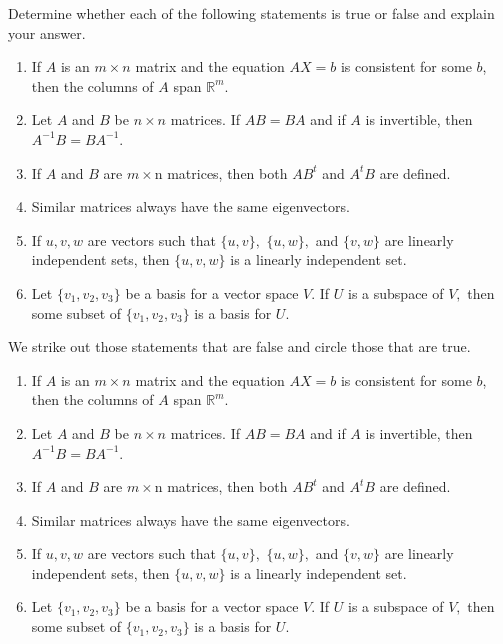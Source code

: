\documentclass{ximera}
\begin{document}


\problemlabel



\begin{exercise}\label{mc.exercise14}

Determine whether each of the following statements is true or false and explain your answer.  
\begin{enumerate}%
\item If $A$ is an $m\times n$ matrix and the equation $AX=b$ is consistent for some $b$, then the columns of $A$ span $\mathbb{R}^m$.
\item Let $A$ and $B$ be $n\times n$ matrices. If $AB = BA$ and if $A$ is invertible, then $A^{-1} B= B A^{-1}$. 
\item If $A$ and $B$ are $m\times$n matrices, then both $AB^t$ and $A^t B$ are defined.
\item Similar matrices always have the same eigenvectors.
\item If $u,v,w$ are vectors such that $\{u,v\},$ $\{u,w\},$ and $\{v,w\}$ are linearly independent sets, then $\{u,v,w\}$ is a linearly independent set.
\item Let $\{v_1,v_2,v_3\}$ be a basis for a vector space $V$. If $U$ is a subspace of $V,$ then some subset of $\{v_1,v_2,v_3\}$ is a basis for $U$.
\end{enumerate}
\begin{solution}

\ans 
We strike out those statements that are false and circle those that are true.
\begin{enumerate}%
\item {If $A$ is an $m\times n$ matrix and the equation $AX=b$ is consistent for some $b$, then the columns of $A$ span $\mathbb{R}^m$.}
\item {Let $A$ and $B$ be $n\times n$ matrices. If $AB = BA$ and if $A$ is invertible, then $A^{-1} B= B A^{-1}$.}
\item {If $A$ and $B$ are $m\times$n matrices, then both $AB^t$ and $A^t B$ are defined.}
\item {Similar matrices always have the same eigenvectors.}
\item {If $u,v,w$ are vectors such that $\{u,v\},$ $\{u,w\},$ and $\{v,w\}$ are linearly independent sets, then $\{u,v,w\}$ is a linearly independent set.}
\item {Let $\{v_1,v_2,v_3\}$ be a basis for a vector space $V$. If $U$ is a subspace of $V,$ then some subset of $\{v_1,v_2,v_3\}$ is a basis for $U$.}
\end{enumerate}


\end{solution}
\end{exercise}
\end{document}
